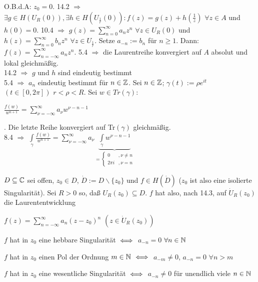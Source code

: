 \documentclass[a4paper,twoside,DIV15,BCOR12mm]{scrbook}
\def\gdw{\equizu}
\def\gdw{\equizu}
\begin{document}
\begin{beweis}
O.B.d.A: $z_0 = 0$. 14.2 $\Rightarrow$ $\exists g \in H(U_R(0)), \exists h \in
H(U_{\frac{1}{r}}(0)): f(z) = g(z) + h(\frac{1}{z})$ $\forall z \in A$ und $h(0)
= 0.$ 10.4 $\Rightarrow$ $g(z) = \sum\limits_{n=0}^{\infty} a_n z^n$
$\forall z \in U_R(0)$ und $h(z) = \sum\limits_{n=0}^{\infty} b_n z^n$
$\forall z \in U_{\frac{1}{r}}$. Setze $a_{-n} := b_n$ für $n \geq 1$. Dann: 
$f(z) = \sum\limits_{n=-\infty}^{\infty} a_n z^n$. 5.4 $\Rightarrow$ die
Laurentreihe konvergiert auf $A$ absolut und lokal gleichmäßig. \\
14.2 $\Rightarrow$ $g$ und $h$ sind eindeutig bestimmt \\ 5.4 $\Rightarrow$
$a_n$ eindeutig bestimmt für $n \in \mathbb{Z}$. Sei $n \in \mathbb{Z}$; $\gamma(t) := \rho
e^{it}$ $(t \in [0, 2 \pi])$ $r<\rho <R$. Sei $w \in Tr(\gamma)$: \\
\centerline{$\frac{f(w)}{w^{n+1}} = \sum\limits_{\nu=-\infty}^{\infty} a_\nu w^{\nu - n -1}$}.
Die letzte Reihe konvergiert auf Tr$(\gamma)$ gleichmäßig. \\
8.4 $\Rightarrow$ $\int\limits_{\gamma} \frac{f(w)}{w^{n+1}}= \sum\limits_{\nu=-\infty}^{\infty} a_\nu
\underbrace{\int\limits_{\gamma} w^{\nu -n -1}}_{
= \begin{cases} 0 &, \nu \neq n \\
  				2 \pi i & , \nu = n
  \end{cases}}$
\end{beweis}

\begin{satz}
$D \subseteq \mathbb{C}$ sei offen, $z_0 \in D$, $\dot{D} := D \backslash \{ z_0 \}$
und $f \in H(\dot{D})$ ($z_0$ ist also eine isolierte Singularität). Sei $R > 0$
so, daß $U_R(z_0) \subseteq D$. $f$ hat also, nach 14.3, auf $\dot{U}_R(z_0)$ die
Laurententwicklung \\
\centerline{$f(z) = \sum\limits_{n=-\infty}^{\infty} a_n(z-z_0)^n$ $(z \in
\dot{U}_R(z_0))$} 
\begin{liste}
\item $f$ hat in $z_0$ eine hebbare Singularität $\gdw$ $a_{-n} = 0$ $\forall n
\in \mathbb{N}$
\item $f$ hat in $z_0$ einen Pol der Ordnung $m \in \mathbb{N}$ $\gdw$ $a_{-m} \neq 0$, 
$a_{-n} = 0$ $\forall n > m$
\item $f$ hat in $z_0$ eine wesentliche Singularität $\gdw$ $a_{-n} \neq 0$ für
unendlich viele $n \in \mathbb{N}$
\end{liste}
\end{satz}
\end{document}
